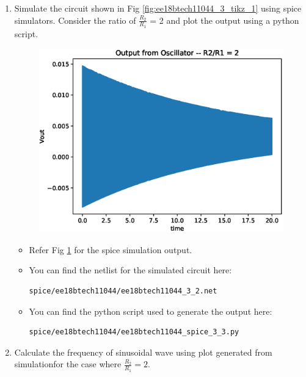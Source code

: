 \begin{enumerate}[label=\arabic*.,ref=\theenumi]
\item Simulate the circuit shown in Fig \ref{fig:ee18btech11044_3_tikz_1} using spice simulators. Consider the ratio of $\frac{R_2}{R_1}$ = 2 and plot the output using a python script.
\begin{figure}[!ht]
\centering
\includegraphics[width=\columnwidth]{./figs/ee18btech11044/ee18btech11044_3_8.eps}
\caption{}
\label{fig:ee18btech11044_3_8}
\end{figure}

\solution

\begin{itemize}
\item Refer Fig \ref{fig:ee18btech11044_3_8} for the spice simulation output.  
\item You can find the netlist for the simulated circuit here:
\begin{lstlisting}
spice/ee18btech11044/ee18btech11044_3_2.net
\end{lstlisting}
\item You can find the python script used to generate the output here:
\begin{lstlisting}
spice/ee18btech11044/ee18btech11044_spice_3_3.py
\end{lstlisting}
\end{itemize}




\item Calculate the frequency of sinusoidal wave using plot generated from simulationfor the case where $\frac{R_2}{R_1} =2$.
 

\end{enumerate}
